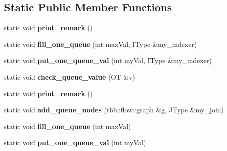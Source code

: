 \subsection*{Static Public Member Functions}
\begin{DoxyCompactItemize}
\item 
\hypertarget{classserial__queue__helper_adcae8026f6a64515ca8a94c35e8a7866}{}static void {\bfseries print\+\_\+remark} ()\label{classserial__queue__helper_adcae8026f6a64515ca8a94c35e8a7866}

\item 
\hypertarget{classserial__queue__helper_a4d6569ec3761c4fda486510805c15a44}{}static void {\bfseries fill\+\_\+one\+\_\+queue} (int max\+Val, I\+Type \&my\+\_\+indexer)\label{classserial__queue__helper_a4d6569ec3761c4fda486510805c15a44}

\item 
\hypertarget{classserial__queue__helper_a32bcd60cd75ea526f90a586e01e878c8}{}static void {\bfseries put\+\_\+one\+\_\+queue\+\_\+val} (int my\+Val, I\+Type \&my\+\_\+indexer)\label{classserial__queue__helper_a32bcd60cd75ea526f90a586e01e878c8}

\item 
\hypertarget{classserial__queue__helper_ad6ee81a7adef71fb9151f23b1babc757}{}static void {\bfseries check\+\_\+queue\+\_\+value} (O\+T \&v)\label{classserial__queue__helper_ad6ee81a7adef71fb9151f23b1babc757}

\item 
\hypertarget{classserial__queue__helper_adcae8026f6a64515ca8a94c35e8a7866}{}static void {\bfseries print\+\_\+remark} ()\label{classserial__queue__helper_adcae8026f6a64515ca8a94c35e8a7866}

\item 
\hypertarget{classserial__queue__helper_a0c36e27c5d4487ec3541a657317a6570}{}static void {\bfseries add\+\_\+queue\+\_\+nodes} (tbb\+::flow\+::graph \&g, J\+Type \&my\+\_\+join)\label{classserial__queue__helper_a0c36e27c5d4487ec3541a657317a6570}

\item 
\hypertarget{classserial__queue__helper_a3c67e2dee7c4c41c3aa88b3fcd671e26}{}static void {\bfseries fill\+\_\+one\+\_\+queue} (int max\+Val)\label{classserial__queue__helper_a3c67e2dee7c4c41c3aa88b3fcd671e26}

\item 
\hypertarget{classserial__queue__helper_a7dcb9f5278c28f6c11994cb78f053a63}{}static void {\bfseries put\+\_\+one\+\_\+queue\+\_\+val} (int my\+Val)\label{classserial__queue__helper_a7dcb9f5278c28f6c11994cb78f053a63}


\end{DoxyCompactItemize}
